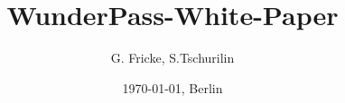 \documentclass[11pt]{scrartcl}
\title{WunderPass-White-Paper}
\author{G. Fricke, S.Tschurilin}
\date{\today{}, Berlin}
\begin{document}
\maketitle
\tableofcontents{}



 
\end{document}
